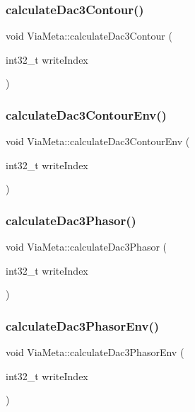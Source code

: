 \subsubsection{\texorpdfstring{calculate\+Dac3\+Contour()}{calculateDac3Contour()}}
{\footnotesize\ttfamily void Via\+Meta\+::calculate\+Dac3\+Contour (\begin{DoxyParamCaption}\item[{int32\+\_\+t}]{write\+Index }\end{DoxyParamCaption})}

\mbox{\label{class_via_meta_a6b8b934f8dfa1e26cf7136e4421a9a80}} 
\subsubsection{\texorpdfstring{calculate\+Dac3\+Contour\+Env()}{calculateDac3ContourEnv()}}
{\footnotesize\ttfamily void Via\+Meta\+::calculate\+Dac3\+Contour\+Env (\begin{DoxyParamCaption}\item[{int32\+\_\+t}]{write\+Index }\end{DoxyParamCaption})}

\mbox{\label{class_via_meta_a52d062ff1d9a7f039c81abd9e75dd91f}} 
\subsubsection{\texorpdfstring{calculate\+Dac3\+Phasor()}{calculateDac3Phasor()}}
{\footnotesize\ttfamily void Via\+Meta\+::calculate\+Dac3\+Phasor (\begin{DoxyParamCaption}\item[{int32\+\_\+t}]{write\+Index }\end{DoxyParamCaption})}

\mbox{\label{class_via_meta_a72ca10d0f7265a4afc233993affc6668}} 
\subsubsection{\texorpdfstring{calculate\+Dac3\+Phasor\+Env()}{calculateDac3PhasorEnv()}}
{\footnotesize\ttfamily void Via\+Meta\+::calculate\+Dac3\+Phasor\+Env (\begin{DoxyParamCaption}\item[{int32\+\_\+t}]{write\+Index }\end{DoxyParamCaption})}

